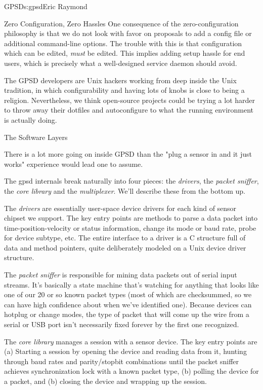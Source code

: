 \begin{aosachapter}{GPSD}{s:gpsd}{Eric Raymond}
\begin{aosasect1}{Zero Configuration, Zero Hassles}
One consequence of the zero-configuration philosophy is that we 
do not look with favor on proposals to add a config file or
additional command-line options.  The trouble with this is that
configuration which can be edited, \emph{must} be edited.  This implies
adding setup hassle for end users, which is precisely what a
well-designed service daemon should avoid.

The GPSD developers are Unix hackers working from deep inside the
Unix tradition, in which configurability and having lots of knobs
is close to being a religion.  Nevertheless, we think open-source
projects could be trying a lot harder to throw away their dotfiles
and autoconfigure to what the running environment is actually doing.

\end{aosasect1}

\begin{aosasect1}{The Software Layers}

There is a lot more going on inside GPSD than the "plug a sensor in
and it just works" experience would lead one to assume. 

The gpsd internals break naturally into four pieces: the \emph{drivers},
the \emph{packet sniffer}, the \emph{core library} and the \emph{multiplexer}. We'll
describe these from the bottom up.

The \emph{drivers} are essentially user-space device drivers for each kind
of sensor chipset we support.  The key entry points are methods to
parse a data packet into time-position-velocity or status information,
change its mode or baud rate, probe for device subtype, etc.  The entire
interface to a driver is a C structure full of data and method pointers,
quite deliberately modeled on a Unix device driver structure.

The \emph{packet sniffer} is responsible for mining data packets out of
serial input streams.  It's basically a state machine that's watching
for anything that looks like one of our 20 or so known packet types
(most of which are checksummed, so we can have high confidence about
when we've identified one).  Because devices can hotplug or change
modes, the type of packet that will come up the wire from a serial or
USB port isn't necessarily fixed forever by the first one recognized.

The \emph{core library} manages a session with a sensor device.  The
key entry points are (a) Starting a session by opening the device and
reading data from it, hunting through baud rates and parity/stopbit
combinations until the packet sniffer achieves synchronization
lock with a known packet type, (b) polling the device for a packet,
and (b) closing the device and wrapping up the session.


\end{aosasect1}
\end{aosachapter}
